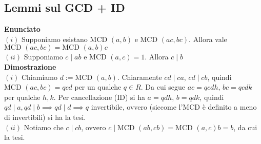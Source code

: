 \documentclass[a4paper,GeneralMath,NoNotes]{stdmdoc}
\newcommand{\Enunciato}{\vskip 0.05cm \noindent \textbf{Enunciato} \\ }
\renewcommand{\Dimostrazione}{\vskip 0.05cm \noindent \textbf{Dimostrazione} \\ }
\newcommand{\MCD}{\text{MCD }}
\begin{document}
	\subsection{Lemmi sul GCD + ID}
	\Enunciato
		$(i)$ Supponiamo esistano $\MCD(a,b)$ e $\MCD(ac,bc)$. Allora vale $\MCD(ac,bc) = \MCD(a,b) c$ \\
		$(ii)$ Supponiamo $c \mid ab$ e $\MCD(a,c) = 1$. Allora $c \mid b$ \\
	\Dimostrazione
		$(i)$ Chiamiamo $d := \MCD(a,b)$. Chiaramente $cd \mid ca$, $cd \mid cb$, quindi $\MCD(ac, bc) = qcd$ per un qualche $q \in R$. Da cui segue $ac = qcdh$, $bc = qcdk$ per qualche $h, k$. Per cancellazione (ID) si ha $a = qdh$, $b = qdk$, quindi $qd \mid a, qd \mid b \implies qd \mid d \implies q$ invertibile, ovvero (siccome l'MCD è definito a meno di invertibili) si ha la tesi. \\
		$(ii)$ Notiamo che $c \mid cb$, ovvero $c \mid \MCD(ab,cb) = \MCD(a,c)b = b$, da cui la tesi.
\end{document}
